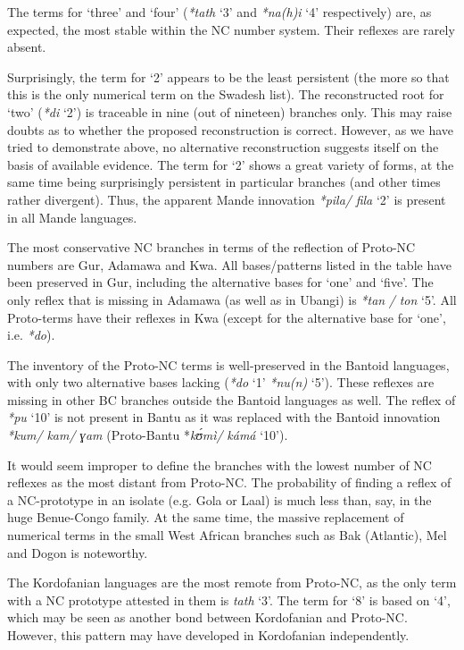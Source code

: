 The terms for ‘three’ and ‘four’ (\textit{*tath} ‘3’ and \textit{*na}\textit{(h}\textit{)i} ‘4’ respectively) are, as expected, the most stable within the NC number system. Their reflexes are rarely absent.

Surprisingly, the term for ‘2’ appears to be the least persistent (the more so that this is the only numerical term on the Swadesh list). The reconstructed root for ‘two’ (\textit{*di} ‘2’) is traceable in nine (out of nineteen) branches only. This may raise doubts as to whether the proposed reconstruction is correct. However, as we have tried to demonstrate above, no alternative reconstruction suggests itself on the basis of available evidence. The term for ‘2’ shows a great variety of forms, at the same time being surprisingly persistent in particular branches (and other times rather divergent). Thus, the apparent Mande innovation \textit{*pila}\textit{/} \textit{fila} ‘2’ is present in all Mande languages.

The most conservative NC branches in terms of the reflection of Proto-NC numbers are Gur, Adamawa and Kwa. All bases/patterns listed in the table have been preserved in Gur, including the alternative bases for ‘one’ and ‘five’. The only reflex that is missing in Adamawa (as well as in Ubangi) is \textit{*tan} \textit{/} \textit{ton} ‘5’. All Proto-terms have their reflexes in Kwa (except for the alternative base for ‘one’, i.e. \textit{*do}).

The inventory of the Proto-NC terms is well-preserved in the Bantoid languages, with only two alternative bases lacking (\textit{*do} ‘1’  \textit{*nu(n)} ‘5’). These reflexes are missing in other BC branches outside the Bantoid languages as well. The reflex of \textit{*pu} ‘10’ is not present in Bantu as it was replaced with the Bantoid innovation \textit{*kum/} \textit{kam/} \textit{ɣam} (Proto-Bantu *\textit{k{\'{ʊ}}mì/} \textit{kámá} ‘10’).

It would seem improper to define the branches with the lowest number of NC reflexes as the most distant from Proto-NC. The probability of finding a reflex of a NC-prototype in an isolate (e.g. Gola or Laal) is much less than, say, in the huge Benue-Congo family. At the same time, the massive replacement of numerical terms in the small West African branches such as Bak (Atlantic), Mel and Dogon is noteworthy.

The Kordofanian languages are the most remote from Proto-NC, as the only term with a NC prototype attested in them is \textit{tath} ‘3’. The term for ‘8’ is based on ‘4’, which may be seen as another bond between Kordofanian and Proto-NC. However, this pattern may have developed in Kordofanian independently. 

